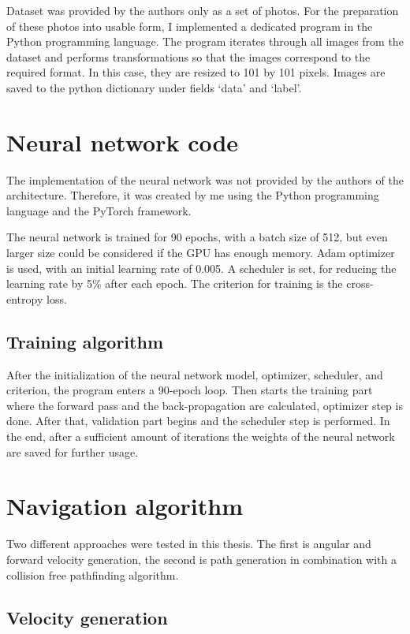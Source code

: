 Dataset was provided by the authors only as a set of photos. For the preparation of these photos into usable form, I implemented a dedicated program in the Python programming language. The program iterates through all images from the dataset and performs transformations so that the images correspond to the required format. In this case, they are resized to 101 by 101 pixels. Images are saved to the python dictionary under fields ‘data’ and ‘label’.

\section{Neural network code}

The implementation of the neural network was not provided by the authors of the architecture. Therefore, it was created by me using the Python programming language and the PyTorch framework.

The neural network is trained for 90 epochs, with a batch size of 512, but even larger size could be considered if the GPU has enough memory. Adam optimizer is used, with an initial learning rate of 0.005. A scheduler is set, for reducing the learning rate by 5\% after each epoch. The criterion for training is the cross-entropy loss. 

\subsection{Training algorithm}

After the initialization of the neural network model, optimizer, scheduler, and criterion, the program enters a 90-epoch loop. Then starts the training part where the forward pass and the back-propagation are calculated, optimizer step is done. After that, validation part begins and the scheduler step is performed. In the end, after a sufficient amount of iterations the weights of the neural network are saved for further usage.


\section{Navigation algorithm}

Two different approaches were tested in this thesis. The first is angular and forward velocity generation, the second is path generation in combination with a collision free pathfinding algorithm. 

\subsection{Velocity generation}

